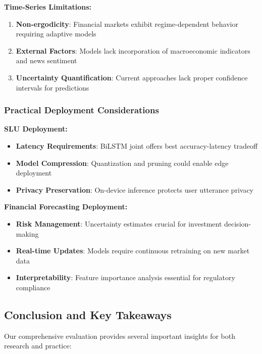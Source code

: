 \documentclass[conference]{IEEEtran}
\begin{document}
\textbf{Time-Series Limitations:}
\begin{enumerate}
  \item \textbf{Non-ergodicity}: Financial markets exhibit regime-dependent behavior requiring adaptive models
  \item \textbf{External Factors}: Models lack incorporation of macroeconomic indicators and news sentiment
  \item \textbf{Uncertainty Quantification}: Current approaches lack proper confidence intervals for predictions
\end{enumerate}

\subsubsection{Practical Deployment Considerations}

\textbf{SLU Deployment:}
\begin{itemize}
  \item \textbf{Latency Requirements}: BiLSTM joint offers best accuracy-latency tradeoff
  \item \textbf{Model Compression}: Quantization and pruning could enable edge deployment
  \item \textbf{Privacy Preservation}: On-device inference protects user utterance privacy
\end{itemize}

\textbf{Financial Forecasting Deployment:}
\begin{itemize}
  \item \textbf{Risk Management}: Uncertainty estimates crucial for investment decision-making
  \item \textbf{Real-time Updates}: Models require continuous retraining on new market data
  \item \textbf{Interpretability}: Feature importance analysis essential for regulatory compliance
\end{itemize}

\subsection{Conclusion and Key Takeaways}

Our comprehensive evaluation provides several important insights for both research and practice:
\end{document}
